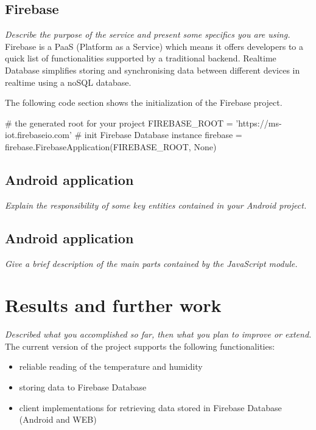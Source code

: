 \documentclass[a4paper,11pt]{article}
\begin{document}
\subsection{Firebase}
\textit{Describe the purpose of the service and present some specifics you are using.}\\

Firebase is a PaaS (Platform as a Service) which means it offers developers to a quick list of functionalities supported by a traditional backend.
Realtime Database simplifies storing and synchronising data between different devices in realtime using a noSQL database.

The following code section shows the initialization of the Firebase project.

\newpage
\begin{python}
# the generated root for your project
FIREBASE_ROOT = 'https://ms-iot.firebaseio.com'
# init Firebase Database instance
firebase = firebase.FirebaseApplication(FIREBASE_ROOT, None)
\end{python}

\subsection{Android application}
\textit{Explain the responsibility of some key entities contained in your Android project.}

\subsection{Android application}
\textit{Give a brief description of the main parts contained by the JavaScript module.}

\section{Results and further work}
\textit{Described what you accomplished so far, then what you plan to improve or extend.}\\

The current version of the project supports the following functionalities:
\begin{itemize}  
\item reliable reading of the temperature and humidity
\item storing data to Firebase Database
\item client implementations for retrieving data stored in Firebase Database (Android and WEB)\\
\end{itemize}
\end{document}
